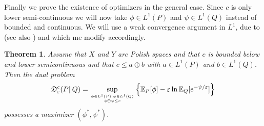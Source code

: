 \documentclass{amsart}
\newtheorem{theorem}{Theorem}[section]
\theoremstyle{definition}
\theoremstyle{remark}
\numberwithin{equation}{section}
\begin{document}
Finally we prove the existence of optimizers in the general case.  Since $c$ is only lower semi-continuous we will now take $\phi \in L^1(P)$ and $\psi \in L^1(Q)$ instead of bounded and continuous. 
We will use a weak convergence argument in $L^1$, due to  \cite{rachev1998mass} (see also  \cite{Villani2003topics}) and which me modify accordingly. 


\begin{theorem}\label{thm:maximizer.generalcase}
Assume that $X$ and $Y$ are Polish spaces and that $c$ is bounded below and lower semicontinuous and that $c \le a \oplus b$ with $a \in L^1(P)$ and $b \in L^1(Q)$.  Then the dual problem 
\begin{equation}
\mathfrak{D}^c_\varepsilon(P\|Q) = \sup_{ \phi\in L^1(P),  \psi\in L^1(Q) \atop \phi \oplus \psi \le c} \left\{ \mathbb{E}_P[\phi] - \varepsilon\ln \mathbb{E}_Q[e^{-\psi/\varepsilon}] \right\}
\end{equation}
possesses a maximizer $(\phi^*, \psi^*)$.
\end{theorem}
\end{document}
